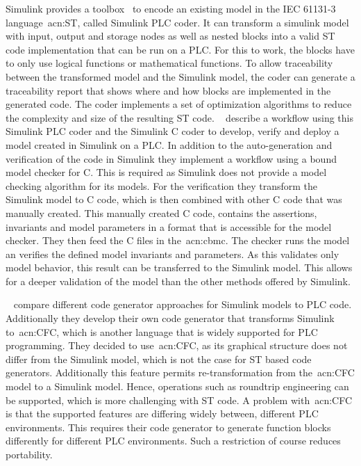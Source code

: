 Simulink provides a toolbox~\cite{Simulink:PLC} to encode an existing model in the IEC 61131-3 language~\acrshort{acn:ST}, called Simulink PLC coder.
It can transform a simulink model with input, output and storage nodes as well as nested blocks into a valid ST code implementation that can be run on a PLC.
For this to work, the blocks have to only use logical functions or mathematical functions.
To allow traceability between the transformed model and the Simulink model, the coder can generate a traceability report that shows where and how blocks are implemented in the generated code.
The coder implements a set of optimization algorithms to reduce the complexity and size of the resulting ST code.
\citeauthor{7535242}~\cite{7535242} describe a workflow using this Simulink PLC coder and the Simulink C coder to develop, verify and deploy a model created in Simulink on a PLC.
In addition to the auto-generation and verification of the code in Simulink they implement a workflow using a bound model checker for C.
This is required as Simulink does not provide a model checking algorithm for its models.
For the verification they transform the Simulink model to C code, which is then combined with other C code that was manually created.
This manually created C code, contains the assertions, invariants and model parameters in a format that is accessible for the model checker.
They then feed the C files in the~\acrfull{acn:cbmc}.
The checker runs the model an verifies the defined model invariants and parameters.
As this validates only model behavior, this result can be transferred to the Simulink model.
This allows for a deeper validation of the model than the other methods offered by Simulink.

\citeauthor{6489667}~\cite{6489667} compare different code generator approaches for Simulink models to PLC code.
Additionally they develop their own code generator that transforms Simulink to~\acrfull{acn:CFC}, which is another language that is widely supported for PLC programming.
They decided to use~\acrshort{acn:CFC}, as its graphical structure does not differ from the Simulink model, which is not the case for ST based code generators.
Additionally this feature permits re-transformation from the~\acrshort{acn:CFC} model to a Simulink model.
Hence, operations such as roundtrip engineering can be supported, which is more challenging with ST code.
A problem with~\acrshort{acn:CFC} is that the supported features are differing widely between, different PLC environments.
This requires their code generator to generate function blocks differently for different PLC environments.
Such a restriction of course reduces portability.

